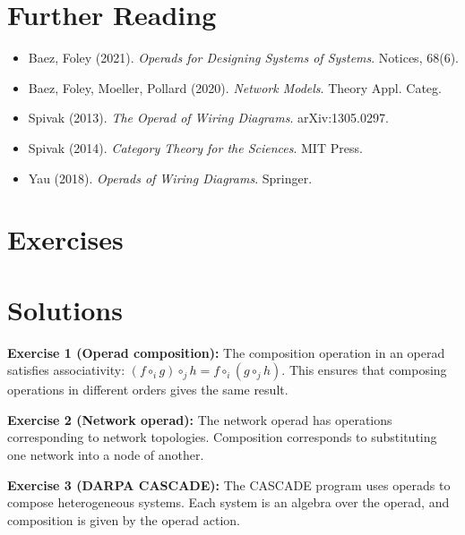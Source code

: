 \section{Further Reading}
\label{sec:op:refs}

\begin{itemize}
    \item Baez, Foley (2021). \textit{Operads for Designing Systems of Systems}. Notices, 68(6).
    \item Baez, Foley, Moeller, Pollard (2020). \textit{Network Models}. Theory Appl. Categ.
    \item Spivak (2013). \textit{The Operad of Wiring Diagrams}. arXiv:1305.0297.
    \item Spivak (2014). \textit{Category Theory for the Sciences}. MIT Press.
    \item Yau (2018). \textit{Operads of Wiring Diagrams}. Springer.
\end{itemize}

\section{Exercises}
\section{Solutions}
\label{sec:op:solutions}

\begin{solution}
\textbf{Exercise 1 (Operad composition):} The composition operation in an operad satisfies associativity: $(f \circ_i g) \circ_j h = f \circ_i (g \circ_j h)$. This ensures that composing operations in different orders gives the same result.
\end{solution}

\begin{solution}
\textbf{Exercise 2 (Network operad):} The network operad has operations corresponding to network topologies. Composition corresponds to substituting one network into a node of another.
\end{solution}

\begin{solution}
\textbf{Exercise 3 (DARPA CASCADE):} The CASCADE program uses operads to compose heterogeneous systems. Each system is an algebra over the operad, and composition is given by the operad action.
\end{solution}

